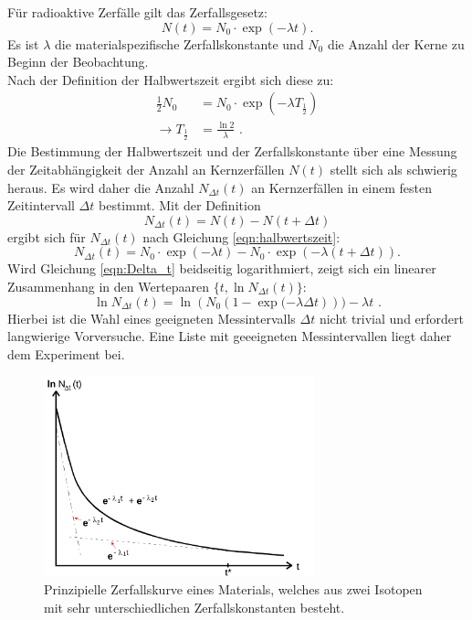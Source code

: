 Für radioaktive Zerfälle gilt das Zerfallsgesetz:
\begin{equation}
  N(t)=N_0 \cdot \exp{(-\lambda t)} \text{.}
\end{equation}
Es ist $\lambda$ die materialspezifische Zerfallskonstante und $N_0$ die Anzahl der Kerne zu Beginn der Beobachtung.\\
Nach der Definition der Halbwertszeit ergibt sich diese zu:
\begin{align}
  \label{eqn:halbwertszeit}
  \frac{1}{2} N_0&= N_0 \cdot \exp{(-\lambda T_\frac{1}{2})}\\
  \rightarrow T_{\frac{1}{2}}&=\frac{\ln{2}}{\lambda} \text{ .}
\end{align}
Die Bestimmung der Halbwertszeit und der Zerfallskonstante über eine Messung der Zeitabhängigkeit der Anzahl an Kernzerfällen $N(t)$ stellt sich als schwierig heraus.
Es wird daher die Anzahl $N_{\Delta t}(t)$ an Kernzerfällen in einem festen Zeitintervall $\Delta t$ bestimmt.
Mit der Definition
\begin{equation*}
  N_{\Delta t}(t)=N(t)-N(t+\Delta t)
\end{equation*}
ergibt sich für $N_{\Delta t}(t)$ nach Gleichung \eqref{eqn:halbwertszeit}:
\begin{equation}
  \label{eqn:Delta_t}
  N_{\Delta t}(t)=N_0 \cdot \exp{(-\lambda t)}-N_0 \cdot \exp{(-\lambda(t+\Delta t))} \text{.}
\end{equation}
Wird Gleichung \eqref{eqn:Delta_t} beidseitig logarithmiert, zeigt sich ein linearer Zusammenhang in den Wertepaaren $\{t, \ln{N_{\Delta t}(t)}\}$:
\begin{equation}
  \label{eqn:ausgleichsrechnung}
  \ln{  N_{\Delta t}(t)}=\ln{(N_0 \left(1- \exp{(-\lambda \Delta t}\right)))}-\lambda t \text{ .}
\end{equation}
Hierbei ist die Wahl eines geeigneten Messintervalls $\Delta t$ nicht trivial und erfordert langwierige Vorversuche. Eine Liste mit geeeigneten Messintervallen liegt daher dem Experiment bei.
\begin{figure}
  \centering
  \includegraphics[width=0.7\textwidth]{Bilder/zerfallskurve.png}
  \caption{Prinzipielle Zerfallskurve eines Materials, welches aus zwei Isotopen mit sehr unterschiedlichen Zerfallskonstanten besteht. \cite{Anleitung}}
  \label{fig:zerfallskurve}
\end{figure}


